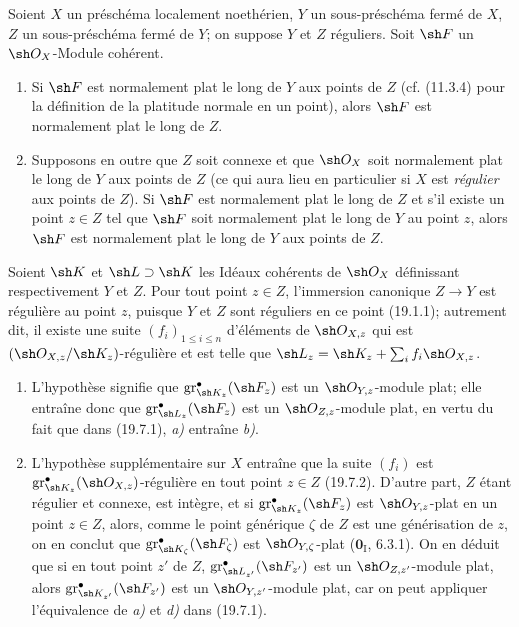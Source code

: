\begin{corollary}[19.7.5]
\label{IV.19.7.5}
Soient $X$ un préschéma localement noethérien, $Y$ un sous-préschéma fermé de $X$, $Z$ un sous-préschéma fermé de $Y$; on suppose $Y$ et $Z$ réguliers. Soit $\sh F$ un $\sh O_X$-Module cohérent.
\begin{enumerate}
  \item[\textup{(i)}] Si $\sh F$ est normalement plat le long de $Y$ aux points de $Z$ \textup{(cf. (11.3.4) pour la définition de la platitude normale en un point)}, alors $\sh F$ est normalement plat le long de $Z$.
  \item[\textup{(ii)}] Supposons en outre que $Z$ soit connexe et que $\sh O_X$ soit normalement plat le long de $Y$ aux points de $Z$ \textup{(ce qui aura lieu en particulier si $X$ est \emph{régulier} aux points de $Z$)}. Si $\sh F$ est normalement plat le long de $Z$ et s'il existe \textup{un} point $z\in Z$ tel que $\sh F$ soit normalement plat le long de $Y$ au point $z$, alors $\sh F$ est normalement plat le long de $Y$ aux points de $Z$.
\end{enumerate}
\end{corollary}

Soient $\sh K$ et $\sh L\supset\sh K$ les Idéaux cohérents de $\sh O_X$ définissant respectivement $Y$ et $Z$. Pour tout point $z\in Z$, l'immersion canonique $Z\to Y$ est régulière au point $z$, puisque $Y$ et $Z$ sont réguliers en ce point (19.1.1); autrement dit, il existe une suite $(f_i)_{1\leq i\leq n}$ d'éléments de $\sh O_{X,z}$ qui est $(\sh O_{X,z}/\sh K_z)$-régulière et est telle que $\sh L_z=\sh K_z+\sum_i f_i\sh O_{X,z}$.
\begin{enumerate}
  \item[(i)] L'hypothèse signifie que $\operatorname{gr}_{\sh K_z}^\bullet(\sh F_z)$ est un $\sh O_{Y,z}$-module plat; elle entraîne donc que $\operatorname{gr}_{\sh L_z}^\bullet(\sh F_z)$ est un $\sh O_{Z,z}$-module plat, en vertu du fait que dans (19.7.1), \emph{a)} entraîne \emph{b)}.
  \item[(ii)] L'hypothèse supplémentaire sur $X$ entraîne que la suite $(f_i)$ est $\operatorname{gr}_{\sh K_z}^\bullet(\sh O_{X,z})$-régulière en tout point $z\in Z$ (19.7.2). D'autre part, $Z$ étant régulier et connexe, est intègre, et si $\operatorname{gr}_{\sh K_z}^\bullet(\sh F_z)$ est $\sh O_{Y,z}$-plat en un point $z\in Z$, alors, comme le point générique $\zeta$ de $Z$ est une générisation de $z$, on en conclut que $\operatorname{gr}_{\sh K_\zeta}^\bullet(\sh F_\zeta)$ est $\sh O_{Y,\zeta}$-plat ($\mathbf{0}_{\mathrm I}$, 6.3.1). On en déduit que si en tout point $z'$ de $Z$, $\operatorname{gr}_{\sh L_{z'}}^\bullet(\sh F_{z'})$ est un $\sh O_{Z,z'}$-module plat, alors $\operatorname{gr}_{\sh K_{z'}}^\bullet(\sh F_{z'})$ est un $\sh O_{Y,z'}$-module plat, car on peut appliquer l'équivalence de \emph{a)} et \emph{d)} dans (19.7.1).
\end{enumerate}

